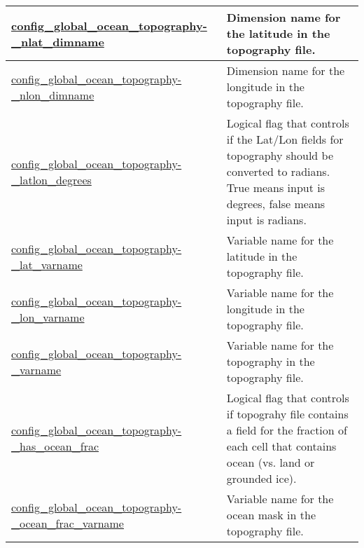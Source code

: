 {\begin{center}
\begin{longtable}{| p{2.0in} || p{4.0in} |}
    \hline
    \hyperref[subsec:nm_sec_config_global_ocean_topography_nlat_dimname]{config\_global\_ocean\_topography-}\hyperref[subsec:nm_sec_config_global_ocean_topography_nlat_dimname]{\_nlat\_dimname}& Dimension name for the latitude in the topography file. \\
    \hline
    \hyperref[subsec:nm_sec_config_global_ocean_topography_nlon_dimname]{config\_global\_ocean\_topography-}\hyperref[subsec:nm_sec_config_global_ocean_topography_nlon_dimname]{\_nlon\_dimname}& Dimension name for the longitude in the topography file. \\
    \hline
    \hyperref[subsec:nm_sec_config_global_ocean_topography_latlon_degrees]{config\_global\_ocean\_topography-}\hyperref[subsec:nm_sec_config_global_ocean_topography_latlon_degrees]{\_latlon\_degrees}& Logical flag that controls if the Lat/Lon fields for topography should be converted to radians. True means input is degrees, false means input is radians. \\
    \hline
    \hyperref[subsec:nm_sec_config_global_ocean_topography_lat_varname]{config\_global\_ocean\_topography-}\hyperref[subsec:nm_sec_config_global_ocean_topography_lat_varname]{\_lat\_varname}& Variable name for the latitude in the topography file. \\
    \hline
    \hyperref[subsec:nm_sec_config_global_ocean_topography_lon_varname]{config\_global\_ocean\_topography-}\hyperref[subsec:nm_sec_config_global_ocean_topography_lon_varname]{\_lon\_varname}& Variable name for the longitude in the topography file. \\
    \hline
    \hyperref[subsec:nm_sec_config_global_ocean_topography_varname]{config\_global\_ocean\_topography-}\hyperref[subsec:nm_sec_config_global_ocean_topography_varname]{\_varname}& Variable name for the topography in the topography file. \\
    \hline
    \hyperref[subsec:nm_sec_config_global_ocean_topography_has_ocean_frac]{config\_global\_ocean\_topography-}\hyperref[subsec:nm_sec_config_global_ocean_topography_has_ocean_frac]{\_has\_ocean\_frac}& Logical flag that controls if topograhy file contains a field for the fraction of each cell that contains ocean (vs. land or grounded ice). \\
    \hline
    \hyperref[subsec:nm_sec_config_global_ocean_topography_ocean_frac_varname]{config\_global\_ocean\_topography-}\hyperref[subsec:nm_sec_config_global_ocean_topography_ocean_frac_varname]{\_ocean\_frac\_varname}& Variable name for the ocean mask in the topography file. \\

\end{longtable}
\end{center}}
